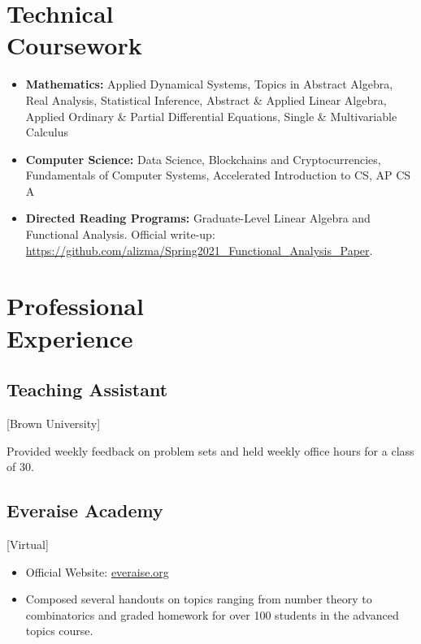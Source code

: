 \documentclass{mycv}
\begin{document}
\maketitle%

\section{Technical \\ Coursework}

\begin{itemize}
    \item \textbf{Mathematics:} Applied Dynamical Systems, Topics in Abstract Algebra, Real Analysis, Statistical Inference, Abstract \& Applied Linear Algebra, Applied Ordinary \& Partial Differential Equations, Single \& Multivariable Calculus
    \item \textbf{Computer Science:} Data Science,  Blockchains and Cryptocurrencies, Fundamentals of Computer Systems, Accelerated Introduction to CS, AP CS A 
    \item \textbf{Directed Reading Programs:} Graduate-Level Linear Algebra and Functional Analysis. Official write-up: \url{https://github.com/alizma/Spring2021_Functional_Analysis_Paper}.
\end{itemize}

\section{Professional \\ Experience}

\subsection{Teaching Assistant}[Brown University]
\begin{positions}
\end{positions}
Provided weekly feedback on problem sets and held weekly office hours for a class of 30. 

\subsection{Everaise Academy}[Virtual]
\begin{positions}
\end{positions}

\begin{itemize}
  \item Official Website: \href{everaise.org}{everaise.org}
  \item Composed several handouts on topics ranging from number theory to combinatorics and graded homework for over 100 students in the advanced topics course.
\end{itemize}
\end{document}
